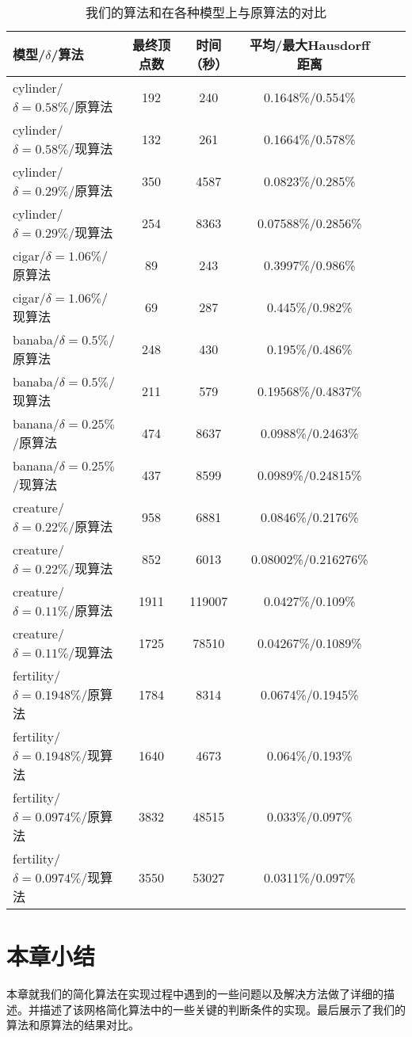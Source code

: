 \begin{table}[H]
     \centering
     \caption{我们的算法和在各种模型上与原算法的对比}\label{tab:compare_res}
    \begin{tabu}{lccccc} %
    \toprule
    \textbf{模型/$\delta$/算法} & \textbf{最终顶点数} & \textbf{时间}（秒） & \textbf{平均/最大Hausdorff距离}\\
    \midrule
    cylinder/$\delta=0.58\%$/原算法     & 192  & 240 & 0.1648\%/0.554\%\\
    cylinder/$\delta=0.58\%$/现算法     & 132  & 261 & 0.1664\%/0.578\%\\
    cylinder/$\delta=0.29\%$/原算法     & 350  & 4587 & 0.0823\%/0.285\%\\
    cylinder/$\delta=0.29\%$/现算法     & 254  & 8363 & 0.07588\%/0.2856\%\\
    cigar/$\delta=1.06\%$/原算法        & 89 & 243 & 0.3997\%/0.986\%\\
    cigar/$\delta=1.06\%$/现算法        & 69 & 287 & 0.445\%/0.982\%\\
    banaba/$\delta=0.5\%$/原算法        & 248 & 430 & 0.195\%/0.486\%\\
    banaba/$\delta=0.5\%$/现算法        & 211 & 579 & 0.19568\%/0.4837\%\\
    banana/$\delta=0.25\%$/原算法       & 474 & 8637 & 0.0988\%/0.2463\%\\
    banana/$\delta=0.25\%$/现算法       & 437 & 8599 & 0.0989\%/0.24815\%\\
    creature/$\delta=0.22\%$/原算法     & 958 & 6881 & 0.0846\%/0.2176\%\\
    creature/$\delta=0.22\%$/现算法     & 852 & 6013 & 0.08002\%/0.216276\%\\
    creature/$\delta=0.11\%$/原算法     & 1911 & 119007 & 0.0427\%/0.109\%\\
    creature/$\delta=0.11\%$/现算法     & 1725 & 78510  & 0.04267\%/0.1089\%\\
    fertility/$\delta=0.1948\%$/原算法     & 1784 & 8314 & 0.0674\%/0.1945\%\\
    fertility/$\delta=0.1948\%$/现算法     & 1640 & 4673 & 0.064\%/0.193\%\\
    fertility/$\delta=0.0974\%$/原算法     & 3832 & 48515 & 0.033\%/0.097\%\\
    fertility/$\delta=0.0974\%$/现算法     & 3550 & 53027 & 0.0311\%/0.097\%\\
    \bottomrule
    \end{tabu}%
\end{table}

\section{本章小结}
本章就我们的简化算法在实现过程中遇到的一些问题以及解决方法做了详细的描述。并描述了该网格简化算法中的一些关键的判断条件的实现。最后展示了我们的算法和原算法的结果对比。
